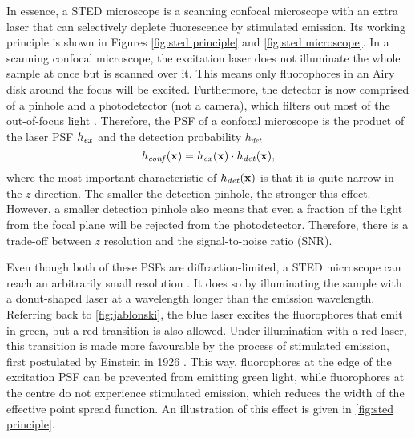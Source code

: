 In essence, a STED microscope is a scanning confocal microscope with an extra laser that can selectively deplete fluorescence by stimulated emission. Its working principle is shown in Figures \ref{fig:sted principle} and \ref{fig:sted microscope}. In a scanning confocal microscope, the excitation laser does not illuminate the whole sample at once but is scanned over it. This means only fluorophores in an Airy disk around the focus will be excited. Furthermore, the detector is now comprised of a pinhole and a photodetector (not a camera), which filters out most of the out-of-focus light \cite{Minsky1957}. Therefore, the PSF of a confocal microscope is the product of the laser PSF $ h_{\mathit{ex}} $ and the detection probability $ h_\mathit{det} $
\begin{equation}
	h_\mathit{conf}(\vb{x}) = h_{\mathit{ex}}(\vb{x}) \cdot h_\mathit{det}(\vb{x}),
\end{equation}
where the most important characteristic of $ h_\mathit{det}(\vb{x}) $ is that it is quite narrow in the $ z $ direction. The smaller the detection pinhole, the stronger this effect. However, a smaller detection pinhole also means that even a fraction of the light from the focal plane will be rejected from the photodetector. Therefore, there is a trade-off between $ z $ resolution and the signal-to-noise ratio (SNR).

Even though both of these PSFs are diffraction-limited, a STED microscope can reach an arbitrarily small resolution \cite{Wildanger2012}. It does so by illuminating the sample with a donut-shaped laser at a wavelength longer than the emission wavelength. Referring back to \autoref{fig:jablonski}, the blue laser excites the fluorophores that emit in green, but a red transition is also allowed. Under illumination with a red laser, this transition is made more favourable by the process of stimulated emission, first postulated by Einstein in 1926 \cite{Einstein1926}. This way, fluorophores at the edge of the excitation PSF can be prevented from emitting green light, while fluorophores at the centre do not experience stimulated emission, which reduces the width of the effective point spread function. An illustration of this effect is given in \autoref{fig:sted principle}.


